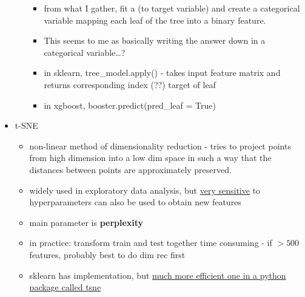 \documentclass[a4paper]{report}
\newcommand{\brown}{\color{brown}}
\begin{document}
\begin{itemize}
\begin{itemize}
\begin{itemize}
	  \item from what I gather, fit a (to target variable) and create a categorical variable mapping each leaf of the tree into a binary feature.
	  \item {\color{red} This seems to me as basically writing the answer down in a categorical variable\dots?}
	  \item in sklearn, {\brown tree\_model.apply()} - takes input feature matrix and returns corresponding index (??) target of leaf
	  \item in xgboost, {\brown booster.predict(pred\_leaf = True)}
	\end{itemize}
    \end{itemize}
  \item t-SNE
    \begin{itemize}
      \item non-linear method of dimensionality reduction - tries to project points from high dimension into a low dim space in such a way that the distances between points are approximately preserved.
      \item widely used in exploratory data analysis, but \underline{very sensitive} to hyperparameters
        \subitem can also be used to obtain new features
      \item main parameter is {\bf perplexity}
      \item in practice:
	\subitem transform train and test together
	\subitem time consuming - if $>500$ features, probably best to do dim rec first
      \item sklearn has implementation, but \underline{much more efficient one in a python package called tsne}
    \end{itemize}
\end{itemize}
\end{document}
